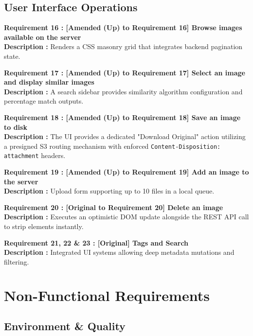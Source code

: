 \documentclass[12pt, a4paper]{article}
\begin{document}
\subsection*{User Interface Operations}

\noindent\textbf{Requirement 16 : [Amended (Up) to Requirement 16] Browse images available on the server}\\
\textbf{Description :} Renders a CSS masonry grid that integrates backend pagination state.
\vspace{1em}

\noindent\textbf{Requirement 17 : [Amended (Up) to Requirement 17] Select an image and display similar images}\\
\textbf{Description :} A search sidebar provides similarity algorithm configuration and percentage match outputs.
\vspace{1em}

\noindent\textbf{Requirement 18 : [Amended (Up) to Requirement 18] Save an image to disk}\\
\textbf{Description :} The UI provides a dedicated "Download Original" action utilizing a presigned S3 routing mechanism with enforced \texttt{Content-Disposition: attachment} headers.
\vspace{1em}

\noindent\textbf{Requirement 19 : [Amended (Up) to Requirement 19] Add an image to the server}\\
\textbf{Description :} Upload form supporting up to 10 files in a local queue.
\vspace{1em}

\noindent\textbf{Requirement 20 : [Original to Requirement 20] Delete an image}\\
\textbf{Description :} Executes an optimistic DOM update alongside the REST API call to strip elements instantly.
\vspace{1em}

\noindent\textbf{Requirement 21, 22 \& 23 : [Original] Tags and Search}\\
\textbf{Description :} Integrated UI systems allowing deep metadata mutations and filtering.

\clearpage

\section{Non-Functional Requirements}

\subsection*{Environment \& Quality}
\end{document}
